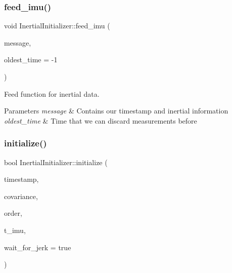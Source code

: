 \subsubsection{\texorpdfstring{feed\+\_\+imu()}{feed\_imu()}}
{\footnotesize\ttfamily void Inertial\+Initializer\+::feed\+\_\+imu (\begin{DoxyParamCaption}\item[{const \hyperlink{structov__core_1_1ImuData}{ov\+\_\+core\+::\+Imu\+Data} \&}]{message,  }\item[{double}]{oldest\+\_\+time = {\ttfamily -\/1} }\end{DoxyParamCaption})}



Feed function for inertial data. 


\begin{DoxyParams}{Parameters}
{\em message} & Contains our timestamp and inertial information \\
\hline
{\em oldest\+\_\+time} & Time that we can discard measurements before \\
\hline
\end{DoxyParams}
\mbox{\label{classov__init_1_1InertialInitializer_aa2288d134687ccf1b7ee85ddcf982991}} 
\subsubsection{\texorpdfstring{initialize()}{initialize()}}
{\footnotesize\ttfamily bool Inertial\+Initializer\+::initialize (\begin{DoxyParamCaption}\item[{double \&}]{timestamp,  }\item[{Eigen\+::\+Matrix\+Xd \&}]{covariance,  }\item[{std\+::vector$<$ std\+::shared\+\_\+ptr$<$ \hyperlink{classov__type_1_1Type}{ov\+\_\+type\+::\+Type} $>$$>$ \&}]{order,  }\item[{std\+::shared\+\_\+ptr$<$ \hyperlink{classov__type_1_1IMU}{ov\+\_\+type\+::\+I\+MU} $>$}]{t\+\_\+imu,  }\item[{bool}]{wait\+\_\+for\+\_\+jerk = {\ttfamily true} }\end{DoxyParamCaption})}



